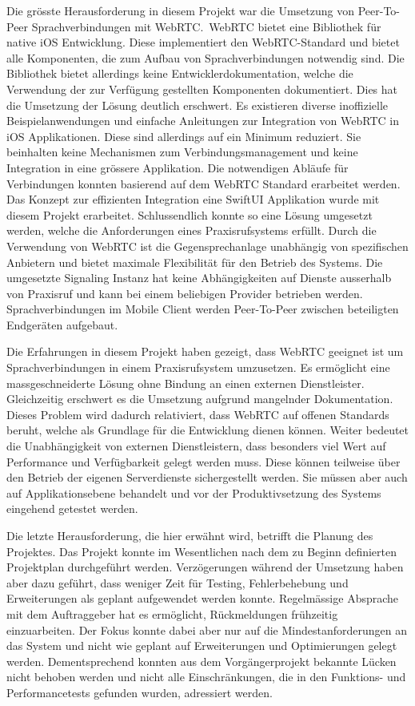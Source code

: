 Die grösste Herausforderung in diesem Projekt war die Umsetzung von Peer-To-Peer Sprachverbindungen mit WebRTC.\
WebRTC bietet eine Bibliothek für native iOS Entwicklung.
Diese implementiert den WebRTC-Standard und bietet alle Komponenten, die zum Aufbau von Sprachverbindungen notwendig sind.
Die Bibliothek bietet allerdings keine Entwicklerdokumentation, welche die Verwendung der zur Verfügung gestellten Komponenten dokumentiert.
Dies hat die Umsetzung der Lösung deutlich erschwert.
Es existieren diverse inoffizielle Beispielanwendungen und einfache Anleitungen zur Integration von WebRTC in iOS Applikationen.
Diese sind allerdings auf ein Minimum reduziert.
Sie beinhalten keine Mechanismen zum Verbindungsmanagement und keine Integration in eine grössere Applikation.
Die notwendigen Abläufe für Verbindungen konnten basierend auf dem WebRTC Standard erarbeitet werden.
Das Konzept zur effizienten Integration eine SwiftUI Applikation wurde mit diesem Projekt erarbeitet.
Schlussendlich konnte so eine Lösung umgesetzt werden, welche die Anforderungen eines Praxisrufsystems erfüllt.
Durch die Verwendung von WebRTC ist die Gegensprechanlage unabhängig von spezifischen Anbietern und bietet maximale Flexibilität für den Betrieb des Systems.
Die umgesetzte Signaling Instanz hat keine Abhängigkeiten auf Dienste ausserhalb von Praxisruf und kann bei einem beliebigen Provider betrieben werden.
Sprachverbindungen im Mobile Client werden Peer-To-Peer zwischen beteiligten Endgeräten aufgebaut.

Die Erfahrungen in diesem Projekt haben gezeigt, dass WebRTC geeignet ist um Sprachverbindungen in einem Praxisrufsystem umzusetzen.
Es ermöglicht eine massgeschneiderte Lösung ohne Bindung an einen externen Dienstleister.
Gleichzeitig erschwert es die Umsetzung aufgrund mangelnder Dokumentation.
Dieses Problem wird dadurch relativiert, dass WebRTC auf offenen Standards beruht, welche als Grundlage für die Entwicklung dienen können.
Weiter bedeutet die Unabhängigkeit von externen Dienstleistern, dass besonders viel Wert auf Performance und Verfügbarkeit gelegt werden muss.
Diese können teilweise über den Betrieb der eigenen Serverdienste sichergestellt werden.
Sie müssen aber auch auf Applikationsebene behandelt und vor der Produktivsetzung des Systems eingehend getestet werden.

Die letzte Herausforderung, die hier erwähnt wird, betrifft die Planung des Projektes.
Das Projekt konnte im Wesentlichen nach dem zu Beginn definierten Projektplan durchgeführt werden.
Verzögerungen während der Umsetzung haben aber dazu geführt, dass weniger Zeit für Testing, Fehlerbehebung und Erweiterungen als geplant aufgewendet werden konnte.
Regelmässige Absprache mit dem Auftraggeber hat es ermöglicht, Rückmeldungen frühzeitig einzuarbeiten.
Der Fokus konnte dabei aber nur auf die Mindestanforderungen an das System und nicht wie geplant auf Erweiterungen und Optimierungen gelegt werden.
Dementsprechend konnten aus dem Vorgängerprojekt bekannte Lücken nicht behoben werden und nicht alle Einschränkungen, die in den Funktions- und Performancetests gefunden wurden, adressiert werden.

